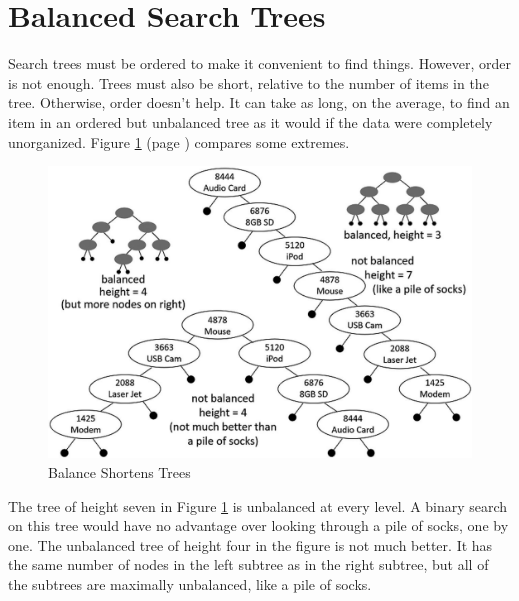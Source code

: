 \section{Balanced Search Trees}

Search trees must be ordered to make it convenient to find things.
However, order is not enough.
Trees must also be short, relative to the number of items in the tree.
Otherwise, order doesn't help. %
It can take as long, on the average, to find an item
in an ordered but unbalanced tree as it would
if the data were completely unorganized.
Figure \ref{fig:unbalanced-trees} (page \pageref{fig:unbalanced-trees})
compares some extremes.

\begin{figure}
\begin{center}
\includegraphics[scale=1]{images-cmyk/unbalanced-trees}
\end{center}
\caption{Balance Shortens Trees}
\label{fig:unbalanced-trees}
\end{figure}

The tree of height seven in
Figure \ref{fig:unbalanced-trees}
is unbalanced at every level.
A binary search on this tree would have no advantage over
looking through a pile of socks, one by one.
The unbalanced tree of height four in the figure is not much better.
It has the same number of nodes in the left subtree as in the right subtree,
but all of the subtrees are maximally unbalanced, like a pile of socks.

